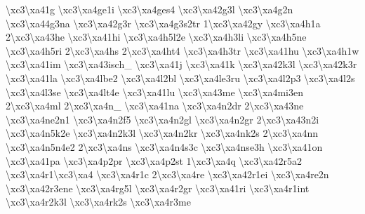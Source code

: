 \begin{DoxyCompactItemize}
\textbackslash{}xc3\textbackslash{}xa41g \textbackslash{}xc3\textbackslash{}xa4ge1i \textbackslash{}xc3\textbackslash{}xa4ges4 \textbackslash{}xc3\textbackslash{}xa42g3l \textbackslash{}xc3\textbackslash{}xa4g2n \textbackslash{}xc3\textbackslash{}xa44g3na \textbackslash{}xc3\textbackslash{}xa42g3r \textbackslash{}xc3\textbackslash{}xa4g3s2tr 1\textbackslash{}xc3\textbackslash{}xa42gy \textbackslash{}xc3\textbackslash{}xa4h1a 2\textbackslash{}xc3\textbackslash{}xa43he \textbackslash{}xc3\textbackslash{}xa41hi \textbackslash{}xc3\textbackslash{}xa4h5l2e \textbackslash{}xc3\textbackslash{}xa4h3li \textbackslash{}xc3\textbackslash{}xa4h5ne \textbackslash{}xc3\textbackslash{}xa4h5ri 2\textbackslash{}xc3\textbackslash{}xa4hs 2\textbackslash{}xc3\textbackslash{}xa4ht4 \textbackslash{}xc3\textbackslash{}xa4h3tr \textbackslash{}xc3\textbackslash{}xa41hu \textbackslash{}xc3\textbackslash{}xa4h1w \textbackslash{}xc3\textbackslash{}xa41im \textbackslash{}xc3\textbackslash{}xa43isch\-\_\- \textbackslash{}xc3\textbackslash{}xa41j \textbackslash{}xc3\textbackslash{}xa41k \textbackslash{}xc3\textbackslash{}xa42k3l \textbackslash{}xc3\textbackslash{}xa42k3r \textbackslash{}xc3\textbackslash{}xa41la \textbackslash{}xc3\textbackslash{}xa4lbe2 \textbackslash{}xc3\textbackslash{}xa4l2bl \textbackslash{}xc3\textbackslash{}xa4le3ru \textbackslash{}xc3\textbackslash{}xa4l2p3 \textbackslash{}xc3\textbackslash{}xa4l2s \textbackslash{}xc3\textbackslash{}xa4l3se \textbackslash{}xc3\textbackslash{}xa4lt4e \textbackslash{}xc3\textbackslash{}xa41lu \textbackslash{}xc3\textbackslash{}xa43me \textbackslash{}xc3\textbackslash{}xa4mi3en 2\textbackslash{}xc3\textbackslash{}xa4ml 2\textbackslash{}xc3\textbackslash{}xa4n\-\_\- \textbackslash{}xc3\textbackslash{}xa41na \textbackslash{}xc3\textbackslash{}xa4n2dr 2\textbackslash{}xc3\textbackslash{}xa43ne \textbackslash{}xc3\textbackslash{}xa4ne2n1 \textbackslash{}xc3\textbackslash{}xa4n2f5 \textbackslash{}xc3\textbackslash{}xa4n2gl \textbackslash{}xc3\textbackslash{}xa4n2gr 2\textbackslash{}xc3\textbackslash{}xa43n2i \textbackslash{}xc3\textbackslash{}xa4n5k2e \textbackslash{}xc3\textbackslash{}xa4n2k3l \textbackslash{}xc3\textbackslash{}xa4n2kr \textbackslash{}xc3\textbackslash{}xa4nk2s 2\textbackslash{}xc3\textbackslash{}xa4nn \textbackslash{}xc3\textbackslash{}xa4n5n4e2 2\textbackslash{}xc3\textbackslash{}xa4ns \textbackslash{}xc3\textbackslash{}xa4n4s3c \textbackslash{}xc3\textbackslash{}xa4nse3h \textbackslash{}xc3\textbackslash{}xa41on \textbackslash{}xc3\textbackslash{}xa41pa \textbackslash{}xc3\textbackslash{}xa4p2pr \textbackslash{}xc3\textbackslash{}xa4p2st 1\textbackslash{}xc3\textbackslash{}xa4q \textbackslash{}xc3\textbackslash{}xa42r5a2 \textbackslash{}xc3\textbackslash{}xa4r1\textbackslash{}xc3\textbackslash{}xa4 \textbackslash{}xc3\textbackslash{}xa4r1c 2\textbackslash{}xc3\textbackslash{}xa4re \textbackslash{}xc3\textbackslash{}xa42r1ei \textbackslash{}xc3\textbackslash{}xa4re2n \textbackslash{}xc3\textbackslash{}xa42r3ene \textbackslash{}xc3\textbackslash{}xa4rg5l \textbackslash{}xc3\textbackslash{}xa4r2gr \textbackslash{}xc3\textbackslash{}xa41ri \textbackslash{}xc3\textbackslash{}xa4r1int \textbackslash{}xc3\textbackslash{}xa4r2k3l \textbackslash{}xc3\textbackslash{}xa4rk2s \textbackslash{}xc3\textbackslash{}xa4r3me 
\end{DoxyCompactItemize}
